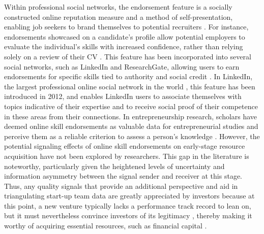 \documentclass[12pt]{article}
\begin{document}
Within professional social networks, the endorsement feature is a socially constructed online reputation measure and a method of self-presentation, enabling job seekers to brand themselves to potential recruiters \citep{rapanta2017linkedin}. For instance, endorsements showcased on a candidate's profile allow potential employers to evaluate the individual's skills with increased confidence, rather than relying solely on a review of their CV \citep{drakopoulos2020building, perez2016endorsement, yan2019social}. This feature has been incorporated into several social networks, such as LinkedIn and ResearchGate, allowing users to earn endorsements for specific skills tied to authority and social credit \citep{perez2016endorsement, rapanta2017linkedin, wu2018analysis}. In LinkedIn, the largest professional online social network in the world \citep{wu2018analysis}, this feature has been introduced in 2012, and enables LinkedIn users to associate themselves with topics indicative of their expertise and to receive social proof of their competence in these areas from their connections. In entrepreneurship research, scholars have deemed online skill endorsements as valuable data for entrepreneurial studies and perceive them as a reliable criterion to assess a person's knowledge \citep{gasiorowski2022pay, reese2020should, sako2020scaling}. However, the potential signaling effects of online skill endorsements on early-stage resource acquisition have not been explored by researchers. This gap in the literature is noteworthy, particularly given the heightened levels of uncertainty \citep{matusik2008values} and information asymmetry between the signal sender and receiver \citep{spence2002signaling} at this stage. Thus, any quality signals that provide an additional perspective and aid in triangulating start-up team data are greatly appreciated by investors because at this point, a new venture typically lacks a performance track record to lean on, but it must nevertheless convince investors of its legitimacy \citep{becker2015new}, thereby making it worthy of acquiring essential resources, such as financial capital \citep{ko2018signaling}.
\end{document}
